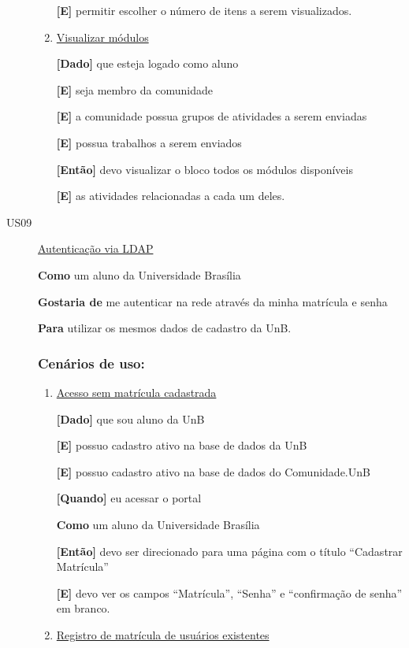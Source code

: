 \begin{description}
\begin{enumerate}
\textbf{[E]} permitir escolher o número de itens a serem visualizados.

\item \underline{Visualizar módulos}

\textbf{[Dado]} que esteja logado como aluno

\textbf{[E]} seja membro da comunidade

\textbf{[E]} a comunidade possua grupos de atividades a serem enviadas

\textbf{[E]} possua trabalhos a serem enviados

\textbf{[Então]} devo visualizar o bloco todos os módulos disponíveis

\textbf{[E]} as atividades relacionadas a cada um deles.

\end{enumerate}

\item [US09\label{us09}]\underline{Autenticação via LDAP}

\textbf{Como} um aluno da Universidade Brasília

\textbf{Gostaria de} me autenticar na rede através da minha matrícula e senha

\textbf{Para} utilizar os mesmos dados de cadastro da UnB.

\subsubsection*{Cenários de uso:}

\begin{enumerate}
\item \underline{Acesso sem matrícula cadastrada}

\textbf{[Dado]} que sou aluno da UnB

\textbf{[E]} possuo cadastro ativo na base de dados da UnB

\textbf{[E]} possuo cadastro ativo na base de dados do Comunidade.UnB

\textbf{[Quando]} eu acessar o portal

\textbf{Como} um aluno da Universidade Brasília

\textbf{[Então]} devo ser direcionado para uma página com o título ``Cadastrar Matrícula''

\textbf{[E]} devo ver os campos ``Matrícula'', ``Senha'' e
``confirmação de senha'' em branco.

\item \underline{Registro de matrícula de usuários existentes}


\end{enumerate}
\end{description}
